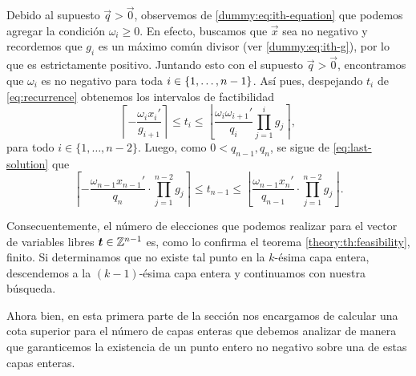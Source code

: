 Debido al supuesto $\vec{q} > \vec{0}$, observemos de \eqref{dummy:eq:ith-equation} que podemos
agregar la condición $\omega_{i} \geq 0$. En efecto, buscamos que $\vec{x}$ sea no negativo y
recordemos que $g_i$ es un máximo común divisor (ver \eqref{dummy:eq:ith-g}), por lo que es
estrictamente positivo. Juntando esto con el supuesto $\vec{q} > \vec{0}$, encontramos que
$\omega_i$ es no negativo para toda $i \in \lbrace 1, \ldots, n - 1 \rbrace$. Así pues, despejando $t_i$ de
\eqref{eq:recurrence} obtenemos los intervalos de factibilidad
\begin{equation*}
	\label{phase-1:finite:eq:param-bounds}
	\left\lceil -\frac{\omega_ix_i'}{g_{i+1}} \right\rceil
	\leq
	t_i
	\leq
	\left\lfloor \frac{\omega_i\omega_{i+1}'}{q_i} \prod_{j=1}^{i}g_j \right\rceil,
\end{equation*}
para todo $i \in \lbrace 1, \ldots, n - 2\rbrace$. Luego, como $0 < q_{n - 1}, q_n$, se sigue de
\eqref{eq:last-solution} que
\begin{equation*}
	\label{phase-1:finite:eq:param-bounds-last}
	\left\lceil -\frac{\omega_{n-1}x_{n-1}'}{q_n} \cdot \prod_{j=1}^{n-2}g_j \right\rceil
	\leq
	t_{n - 1}
	\leq
	\left\lfloor \frac{\omega_{n-1}x_{n}'}{q_{n-1}} \cdot \prod_{j=1}^{n-2}g_j \right\rfloor.
\end{equation*}

Consecuentemente, el número de elecciones que podemos realizar para el vector de variables libres
$\boldsymbol{t} \in \mathbb{Z}^{n-1}$ es, como lo confirma el teorema \ref{theory:th:feasibility}, finito. Si
determinamos que no existe tal punto en la $k$-ésima capa entera, descendemos a la $(k -1)$-ésima
capa entera y continuamos con nuestra búsqueda.


Ahora bien, en esta primera parte de la sección nos encargamos de calcular una cota superior para el
número de capas enteras que debemos analizar de manera que garanticemos la existencia de un punto
entero no negativo sobre una de estas capas enteras.


